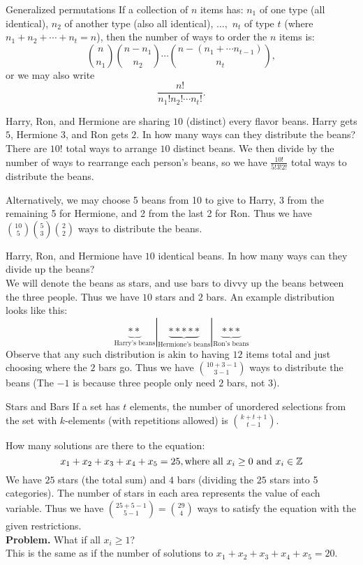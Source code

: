 \documentclass[class=article, crop=false]{standalone}
\begin{document}
  \begin{note}{Generalized permutations}
    If a collection of $n$ items has: $n_1$ of one type (all identical), $n_2$ of another type (also all identical), $\dotsc,$ $n_t$ of type $t$ (where $n_1 + n_2 + \dotsb + n_t = n$), then the number of ways to order the $n$ items is:
    \[
      \binom{n}{n_1}\binom{n-n_1}{n_2}\dotsm \binom{n-(n_1+\dotsb n_{t-1})}{n_t},
    \]
    or we may also write
    \[
      \frac{n!}{n_1!n_2!\dotsm n_t!}.
    \]
  \end{note}
  \begin{example}{}
    Harry, Ron, and Hermione are sharing $10$ (distinct) every flavor beans. Harry gets $5$, Hermione $3$, and Ron gets $2$. In how many ways can they distribute the beans? \\[10pt]
    There are $10!$ total ways to arrange $10$ distinct beans. We then divide by the number of ways to rearrange each person's beans, so we have $\frac{10!}{5!3!2!}$ total ways to distribute the beans.\par
    Alternatively, we may choose 5 beans from 10 to give to Harry, 3 from the remaining 5 for Hermione, and 2 from the last 2 for Ron. Thus we have $\binom{10}{5}\binom{5}{3}\binom{2}{2}$ ways to distribute the beans.
  \end{example}
  \begin{example}{}
    Harry, Ron, and Hermione have $10$ identical beans. In how many ways can they divide up the beans? \\[10pt]
    We will denote the beans as stars, and use bars to divvy up the beans between the three people. Thus we have $10$ stars and $2$ bars. An example distribution looks like this:
    \[
      \underbrace{**}_{\text{Harry's beans}}|\underbrace{*****}_{\text{Hermione's beans}}|\underbrace{***}_{\text{Ron's beans}}
    \]
    Observe that any such distribution is akin to having $12$ items total and just choosing where the $2$ bars go. Thus we have $\binom{10+3-1}{3-1}$ ways to distribute the beans (The $-1$ is because three people only need $2$ bars, not $3$).
  \end{example}
  \begin{note}{Stars and Bars}
    If a set has $t$ elements, the number of unordered selections from the set with $k$-elements (with repetitions allowed) is $\binom{k+t+1}{t-1}$.
  \end{note}
  \begin{example}{}
    How many solutions are there to the equation:
    \[
      x_1 + x_2 + x_3 + x_4 + x_5 = 25, \text{where all }x_i \geq0 \text{ and } x_i\in\mathbb{Z}
    \]
    We have $25$ stars (the total sum) and $4$ bars (dividing the $25$ stars into 5 categories). The number of stars in each area represents the value of each variable. Thus we have $\binom{25+5-1}{5-1} = \binom{29}{4}$ ways to satisfy the equation with the given restrictions. \\[10pt]
    \textbf{Problem.} What if all $x_i\geq 1$? \\[10pt]
    This is the same as if the number of solutions to $x_1 + x_2 + x_3 + x_4 + x_5 = 20$.
  \end{example}
\end{document}
